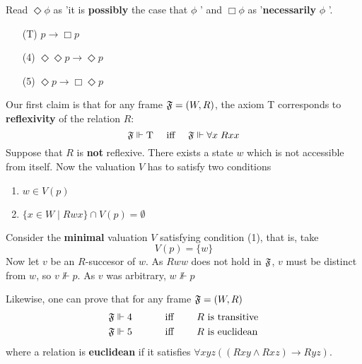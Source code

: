 \documentclass[11pt]{article}
\begin{document}
\begin{examplle}[]
Read \(\Diamond\phi\) as 'it is \textbf{possibly} the case that \(\phi\) ' and \(\Box\phi\) as
'\textbf{necessarily} \(\phi\)  '.
\begin{itemize}
\item [(T)] \(p\to\Box p\)
\item [(4)] \(\Diamond\Diamond p\to\Diamond p\)
\item [(5)] \(\Diamond p\to\Box\Diamond p\)
\end{itemize}

Our first claim is that for any frame \(\mathfrak{F}=(W,R)\), the axiom T corresponds
to \textbf{reflexivity} of the relation \(R\):
\begin{equation*}
\mathfrak{F}\Vdash \text{T}\quad\text{ iff }\quad
\mathfrak{F}\Vdash\forall x\;Rxx
\end{equation*}
Suppose that \(R\) is \textbf{not} reflexive. There exists a state \(w\) which is not
accessible from itself. Now the valuation \(V\) has to satisfy two conditions
\begin{enumerate}
\item \(w\in V(p)\)
\item \(\{x\in W\mid Rwx\}\cap V(p)=\emptyset\)
\end{enumerate}


Consider the \textbf{minimal} valuation \(V\) satisfying condition (1), that is, take
\begin{equation*}
V(p)=\{w\}
\end{equation*}
Now let \(v\) be an \(R\)-succesor of \(w\). As \(Rww\) does not hold in
\(\mathfrak{F}\), \(v\) must be distinct from \(w\), so \(v\not\Vdash p\). As \(v\)
was arbitrary, \(w\not\Vdash p\)

Likewise, one can prove that for any frame \(\mathfrak{F}=(W,R)\)
\begin{alignat*}{3}
&\mathfrak{F}\Vdash4&&\quad\text{ iff }\quad&&R\text{ is transitive}\\
&\mathfrak{F}\Vdash5\quad&&\quad\text{ iff }\quad&&
R \text{ is euclidean}
\end{alignat*}
where a relation is \textbf{euclidean} if it satisfies \(\forall xyz((Rxy\wedge
   Rxz)\to Ryz)\).


\end{examplle}
\end{document}
